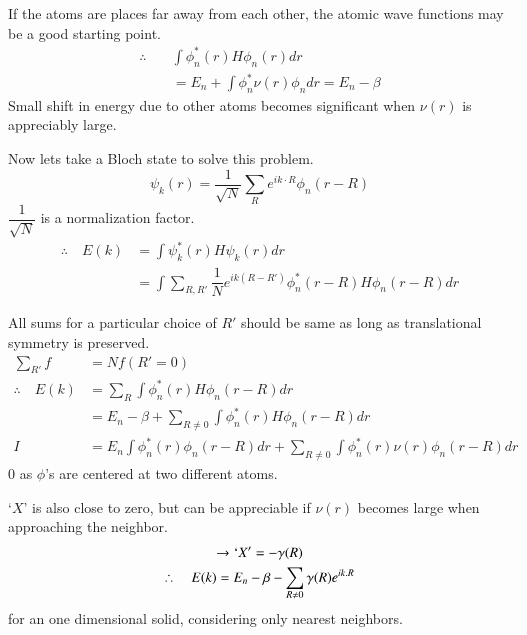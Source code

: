 If the atoms are places far away from each other, the atomic wave functions may be a good starting point.
\begin{align*}
\therefore\quad & \int \phi^{*}_{n}(r)H\phi_{n}(r)dr\\
& =E_{n}+\int\phi^{*}_{n}\nu(r)\phi_{n}dr=E_{n}-\beta
\end{align*}
Small shift in energy due to other atoms becomes significant when $\nu(r)$ is appreciably large.

Now lets take a Bloch state to solve this problem.
$$
\psi_{k}(r)=\dfrac{1}{\sqrt{N}}\sum\limits_{R}e^{ik\cdot R}\phi_{n}(r-R)
$$
$\dfrac{1}{\sqrt{N}}$ is a normalization factor.
\begin{align*}
\therefore\quad E(k) &= \int \psi^{*}_{k}(r)H\psi_{k}(r)dr\\
&= \int \sum\limits_{R,R'}\dfrac{1}{N}e^{ik(R-R')}\phi^{*}_{n}(r-R)H\phi_{n}(r-R)dr
\end{align*}

All sums for a particular choice of $R'$ should be same as long as translational symmetry is preserved.
\begin{align*}
\sum\limits_{R'}f &= Nf(R'=0)\\
\therefore\quad E(k) &= \sum\limits_{R}\int \phi^{*}_{n}(r)H\phi_{n}(r-R)dr\\
&= E_{n}-\beta+\sum\limits_{R\neq 0}\int \phi^{*}_{n}(r)H\phi_{n}(r-R) dr\\
I &= E_{n}\int\phi^{*}_{n}(r)\phi_{n}(r-R)dr+\sum\limits_{R\neq 0}\int \phi^{*}_{n}(r)\nu(r)\phi_{n}(r-R)dr
\end{align*}
$0$ as $\phi$'s are centered at two different atoms.

`$X$' is also close to zero, but can be appreciable if $\nu(r)$ becomes large when approaching the neighbor.
\begin{gather*}
\to `X' = -\gamma(R)\\
\therefore\quad E(k)=E_{n}-\beta-\sum\limits_{R\neq 0}\gamma(R)e^{ik.R}
\end{gather*}
for an one dimensional solid, considering only nearest neighbors.

